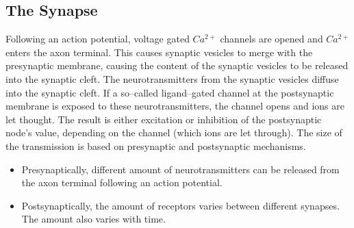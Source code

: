 \subsection{The Synapse}
\label{ssecTheSynapse}
Following an action potential, voltage gated $Ca^{2+}$ channels are opened and $Ca^{2+}$ enters the axon terminal.
This causes synaptic vesicles to merge with the presynaptic membrane, causing the content of the synaptic vesicles to be released into the synaptic cleft. %
The neurotransmitters from the synaptic vesicles diffuse into the synaptic cleft.
If a so--called ligand--gated channel at the postsynaptic membrane is exposed to these neurotransmitters, the channel opens and ions are let thought.
The result is either excitation or inhibition of the postsynaptic node's value, depending on the channel (which ions are let through).
The size of the transmission is based on presynaptic and postsynaptic mechanisms\cite{PurvesNeuroscienceKAP05}.

\begin{itemize}
	\item Presynaptically, different amount of neurotransmitters can be released from the axon terminal following an action potential.
	\item Postsynaptically, the amount of receptors varies between different synapses. The amount also varies with time. %
\end{itemize}

